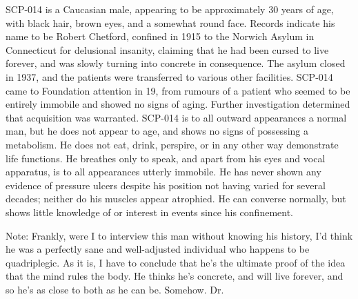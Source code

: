  SCP-014 is a Caucasian male, appearing to be approximately 30 years of age, with black hair, brown eyes, and a somewhat round face. Records indicate his name to be Robert Chetford, confined in 1915 to the Norwich Asylum in Connecticut for delusional insanity, claiming that he had been cursed to live forever, and was slowly turning into concrete in consequence. The asylum closed in 1937, and the patients were transferred to various other facilities. SCP-014 came to Foundation attention in 19, from rumours of a patient who seemed to be entirely immobile and showed no signs of aging. Further investigation determined that acquisition was warranted.
\newpage
SCP-014 is to all outward appearances a normal man, but he does not appear to age, and shows no signs of possessing a metabolism. He does not eat, drink, perspire, or in any other way demonstrate life functions. He breathes only to speak, and apart from his eyes and vocal apparatus, is to all appearances utterly immobile. He has never shown any evidence of pressure ulcers despite his position not having varied for several decades; neither do his muscles appear atrophied. He can converse normally, but shows little knowledge of or interest in events since his confinement.

\linebreak
Note: Frankly, were I to interview this man without knowing his history, I'd think he was a perfectly sane and well-adjusted individual who happens to be quadriplegic. As it is, I have to conclude that he's the ultimate proof of the idea that the mind rules the body. He thinks he's concrete, and will live forever, and so he's as close to both as he can be. Somehow. Dr. 